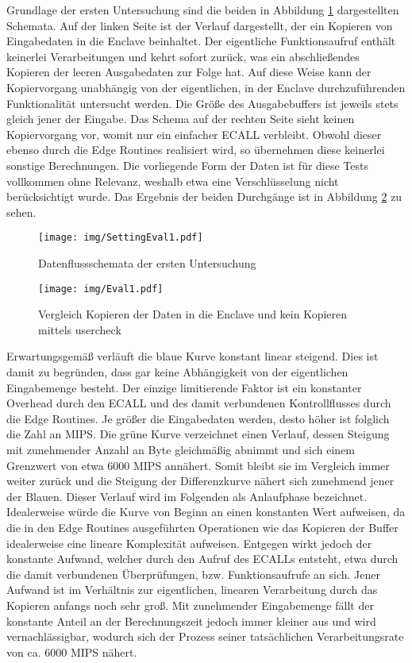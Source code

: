 Grundlage der ersten Untersuchung sind die beiden in Abbildung \ref{fig:settingeval1} dargestellten Schemata. Auf der linken Seite ist der Verlauf dargestellt, der ein Kopieren von Eingabedaten in die Enclave beinhaltet. Der eigentliche Funktionsaufruf enthält keinerlei Verarbeitungen und kehrt sofort zurück, was ein abschließendes Kopieren der leeren Ausgabedaten zur Folge hat. Auf diese Weise kann der Kopiervorgang unabhängig von der eigentlichen, in der Enclave durchzuführenden Funktionalität untersucht werden. Die Größe des Ausgabebuffers ist jeweils stets gleich jener der Eingabe. Das Schema auf der rechten Seite sieht keinen Kopiervorgang vor, womit nur ein einfacher ECALL verbleibt. Obwohl dieser ebenso durch die Edge Routines realisiert wird, so übernehmen diese keinerlei sonstige Berechnungen. Die vorliegende Form der Daten ist für diese Tests vollkommen ohne Relevanz, weshalb etwa eine Verschlüsselung nicht berücksichtigt wurde. Das Ergebnis der beiden Durchgänge ist in Abbildung \ref{fig:eval1} zu sehen.

\begin{figure}[h]
	\texttt{[image: img/SettingEval1.pdf]}
	\centering
	\caption{Datenflussschemata der ersten Untersuchung}
	\label{fig:settingeval1}
\end{figure}

\begin{figure}[h]
	\texttt{[image: img/Eval1.pdf]}
	\centering
	\caption{Vergleich Kopieren der Daten in die Enclave und kein Kopieren mittels user\textunderscore check}
	\label{fig:eval1}
\end{figure}

Erwartungsgemäß verläuft die blaue Kurve konstant linear steigend. Dies ist damit zu begründen, dass  gar keine Abhängigkeit von der eigentlichen Eingabemenge besteht. Der einzige limitierende Faktor ist ein konstanter Overhead durch den ECALL und des damit verbundenen Kontrollflusses durch die Edge Routines. Je größer die Eingabedaten werden, desto höher ist folglich die Zahl an MIPS. Die grüne Kurve verzeichnet einen Verlauf, dessen Steigung mit zunehmender Anzahl an Byte gleichmäßig abnimmt und sich einem Grenzwert von etwa 6000 MIPS annähert. Somit bleibt sie im Vergleich immer weiter zurück und die Steigung der Differenzkurve nähert sich zunehmend jener der Blauen. Dieser Verlauf wird im Folgenden als Anlaufphase bezeichnet. Idealerweise würde die Kurve von Beginn an einen konstanten Wert aufweisen, da die in den Edge Routines ausgeführten Operationen wie das Kopieren der Buffer idealerweise eine lineare Komplexität aufweisen. Entgegen wirkt jedoch der konstante Aufwand, welcher durch den Aufruf des ECALLs entsteht, etwa durch die damit verbundenen Überprüfungen, bzw. Funktionsaufrufe an sich. Jener Aufwand ist im Verhältnis zur eigentlichen, linearen Verarbeitung durch das Kopieren anfangs noch sehr groß. Mit zunehmender Eingabemenge fällt der konstante Anteil an der Berechnungszeit jedoch immer kleiner aus und wird vernachlässigbar, wodurch sich der Prozess seiner tatsächlichen Verarbeitungsrate von ca. 6000 MIPS nähert.

